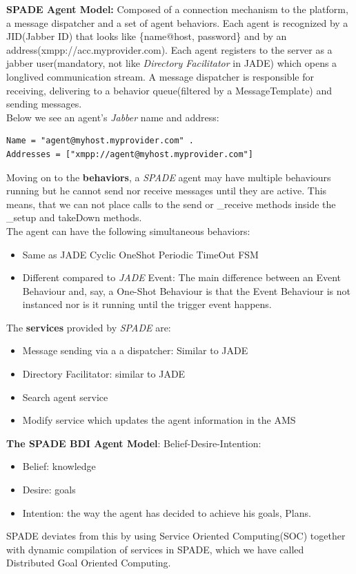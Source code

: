 \documentclass[a4paper, 11pt]{article}
\begin{document}
\textbf{SPADE Agent Model:} Composed of a connection mechanism to the platform, a message dispatcher and a set of agent behaviors. Each agent is recognized by a JID(Jabber ID) that looks like \{name@host, password\} and by an address(xmpp://acc.myprovider.com). Each agent registers to the server as a jabber user(mandatory, not like \textit{Directory Facilitator} in JADE) which opens a longlived communication stream. A message dispatcher is responsible for receiving, delivering to a behavior queue(filtered by a MessageTemplate) and sending messages. \\ 
Below we see an agent's \textit{Jabber} name and address:
\begin{verbatim}
Name = "agent@myhost.myprovider.com" .
Addresses = ["xmpp://agent@myhost.myprovider.com"]
\end{verbatim}
Moving on to the \textbf{behaviors}, a \textit{SPADE} agent may have multiple behaviours running but he cannot send nor receive messages until they are active. This means, that we can not place calls to the send or \_receive methods inside the \_setup and takeDown methods. \\
The agent can have the following simultaneous behaviors: 
\begin{itemize}
	\item Same as JADE
		\subitem Cyclic 
		\subitem OneShot 
		\subitem Periodic
		\subitem TimeOut 
		\subitem FSM
	\item Different compared to \textit{JADE}
		\subitem Event: The main difference between an Event Behaviour and, say, a One-Shot Behaviour is that the Event Behaviour is not instanced nor is it running until the trigger event happens.
\end{itemize}
The \textbf{services} provided by \textit{SPADE} are:
\begin{itemize}
	\item Message sending via a a dispatcher: Similar to JADE
	\item Directory Facilitator: similar to JADE
	\item Search agent service
	\item Modify service which updates the agent information in the AMS
\end{itemize}

\noindent \textbf{The SPADE BDI Agent Model}: Belief-Desire-Intention:
\begin{itemize}
	\item Belief: knowledge
	\item Desire: goals
	\item Intention: the way the agent has decided to achieve his goals, Plans.
\end{itemize}
SPADE deviates from this by using Service Oriented Computing(SOC) together with dynamic compilation of services in SPADE, which we have called Distributed Goal Oriented Computing. \\
\end{document}

